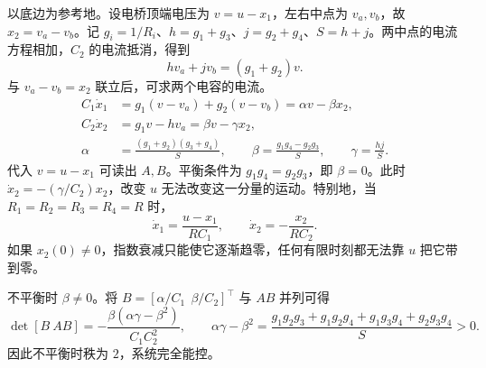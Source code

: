 

\sol 以底边为参考地。设电桥顶端电压为 $v=u-x_1$，左右中点为 $v_a,v_b$，故 $x_2=v_a-v_b$。记 $g_i=1/R_i$、$h=g_1+g_3$、$j=g_2+g_4$、$S=h+j$。两中点的电流方程相加，$C_2$ 的电流抵消，得到
\[
    h v_a+j v_b=(g_1+g_2)v .
\]
与 $v_a-v_b=x_2$ 联立后，可求两个电容的电流。
\[
\begin{aligned}
    C_1\dot x_1&=g_1(v-v_a)+g_2(v-v_b)=\alpha v-\beta x_2,\\
    C_2\dot x_2&=g_1v-hv_a=\beta v-\gamma x_2,\\
    \alpha&=\frac{(g_1+g_2)(g_3+g_4)}{S},\qquad
    \beta=\frac{g_1g_4-g_2g_3}{S},\qquad \gamma=\frac{hj}{S}.
\end{aligned}
\]
代入 $v=u-x_1$ 可读出 $A,B$。平衡条件为 $g_1g_4=g_2g_3$，即 $\beta=0$。此时 $\dot x_2=-(\gamma/C_2)x_2$，改变 $u$ 无法改变这一分量的运动。特别地，当 $R_1=R_2=R_3=R_4=R$ 时，
\[
    \dot x_1=\frac{u-x_1}{RC_1},\qquad
    \dot x_2=-\frac{x_2}{RC_2}.
\]
如果 $x_2(0)\ne0$，指数衰减只能使它逐渐趋零，任何有限时刻都无法靠 $u$ 把它带到零。

不平衡时 $\beta\ne0$。将 $B=[\alpha/C_1\ \ \beta/C_2]^\top$ 与 $AB$ 并列可得
\[
    \det[B\ AB]=-\frac{\beta(\alpha\gamma-\beta^2)}{C_1 C_2^2},\qquad
    \alpha\gamma-\beta^2=\frac{g_1g_2g_3+g_1g_2g_4+g_1g_3g_4+g_2g_3g_4}{S}>0.
\]
因此不平衡时秩为 $2$，系统完全能控。

